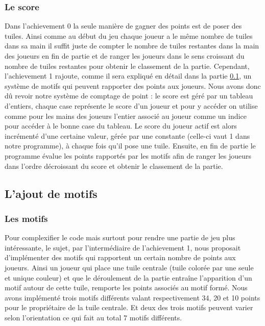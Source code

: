 \documentclass[11pt]{article}
\begin{document}
\subsubsection{Le score} \label{subsec: score}
Dans l'achievement 0  la seule manière de gagner des points est de poser des tuiles. Ainsi comme au début du jeu chaque joueur a le même nombre de tuiles dans sa main il suffit juste de compter le nombre de tuiles restantes dans la main des joueurs en fin de partie et de ranger les joueurs dans le sens croissant du nombre de tuiles restantes pour obtenir le classement de la partie. Cependant, l'achievement 1 rajoute, comme il sera expliqué en détail dans la partie \ref{subsec: patterns}, un système de motifs qui peuvent rapporter des points aux joueurs. Nous avons donc dû revoir notre système de comptage de point : le score est géré par un tableau d'entiers, chaque case représente le score d'un joueur et pour y accéder on utilise comme pour les mains des joueurs l'entier associé au joueur comme un indice pour accéder à le bonne case du tableau. Le score du joueur actif est alors incrémenté d'une certaine valeur, gérée par une constante (celle-ci vaut 1 dans notre programme), à chaque fois qu'il pose une tuile. Ensuite, en fin de partie le programme évalue les points rapportés par les motifs afin de ranger les joueurs dans l'ordre décroissant du score et obtenir le classement de la partie. 


\subsection{L'ajout de motifs} \label{subsec: patterns}
\subsubsection{Les motifs}
Pour complexifier le code mais surtout pour rendre une partie de jeu plus intéressante, le sujet, par l'intermédiaire de l'achievement 1, nous proposait d'implémenter des motifs qui rapportent un certain nombre de points aux joueurs. Ainsi un joueur qui place une tuile centrale (tuile colorée par une seule et unique couleur) et que le déroulement de la partie entraîne l'apparition d'un motif autour de cette tuile, remporte les points associés au motif formé. Nous avons implémenté trois motifs différents valant respectivement 34, 20 et 10 points pour le propriétaire de la tuile centrale. Et deux des trois motifs peuvent varier selon l'orientation ce qui fait au total 7 motifs différents.
\end{document}
